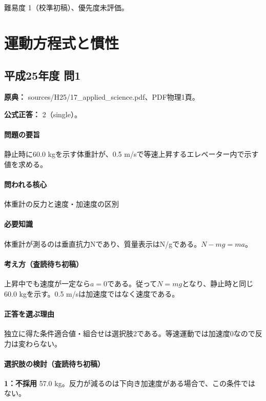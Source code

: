 \par 難易度 1（校準初稿）、優先度未評価。

\section{運動方程式と慣性}

\subsection{平成25年度 問1}
\label{q:h25-reg-applied-01}

\noindent\textbf{原典：} sources/H25/17\_applied\_science.pdf、PDF物理1頁。

\textbf{公式正答：} 2（single）。

\paragraph{問題の要旨} 静止時に60.0 kgを示す体重計が、0.5 m/sで等速上昇するエレベーター内で示す値を求める。

\paragraph{問われる核心} 体重計の反力と速度・加速度の区別

\paragraph{必要知識} 体重計が測るのは垂直抗力Nであり、質量表示はN/gである。\(N-mg=ma\)。

\paragraph{考え方（査読待ち初稿）} 上昇中でも速度が一定なら\(a=0\)である。従って\(N=mg\)となり、静止時と同じ60.0 kgを示す。0.5 m/sは加速度ではなく速度である。

\paragraph{正答を選ぶ理由} 独立に得た条件適合値・組合せは選択肢2である。等速運動では加速度0なので反力は変わらない。

\paragraph{選択肢の検討（査読待ち初稿）}

\noindent\textbf{1：不採用} 57.0 kg。反力が減るのは下向き加速度がある場合で、この条件ではない。\par

